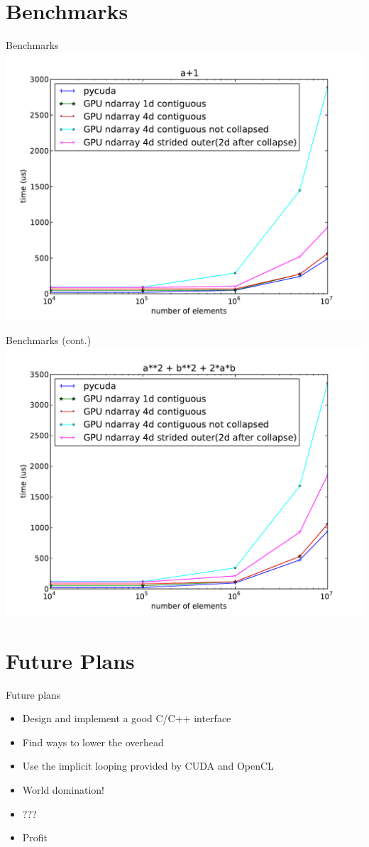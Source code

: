 \documentclass[utf8x,xcolor=pdftex,dvipsnames,table]{beamer}
\begin{document}
\section{Benchmarks}
\begin{frame}{Benchmarks}
\includegraphics[width=\textwidth]{ap1_no_alloc}
\end{frame}

\begin{frame}{Benchmarks (cont.)}
\includegraphics[width=\textwidth]{a2pb2p2ab_no_alloc}
\end{frame}

\section{Future Plans}
\begin{frame}{Future plans}
\begin{itemize}
\item<1-> Design and implement a good C/C++ interface
\item<2-> Find ways to lower the overhead
\item<3-> Use the implicit looping provided by CUDA and OpenCL
\item<4-> World domination!
\item<5-> ???
\item<6-> Profit
\end{itemize}
\end{frame}
\end{document}
